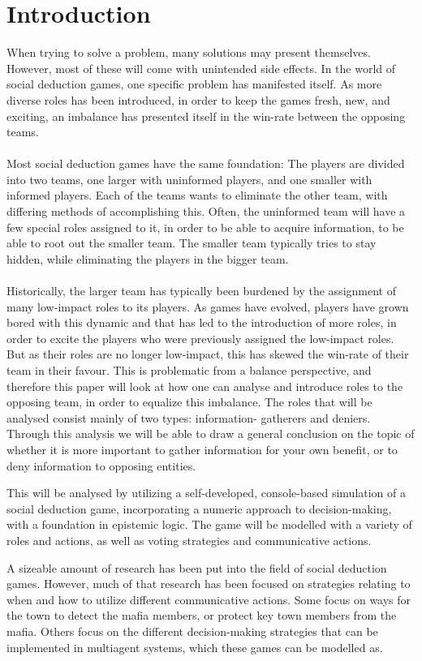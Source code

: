 \section{Introduction}
When trying to solve a problem, many solutions may present themselves. However,
most of these will come with unintended side effects. In the world of social
deduction games, one specific problem has manifested itself. As more diverse
roles has been introduced, in order to keep the games fresh, new, and exciting,
an imbalance has presented itself in the win-rate between the opposing teams.
\\ \\ Most social deduction games have the same foundation: The players are
divided into two teams, one larger with uninformed players, and one smaller
with informed players. Each of the teams wants to eliminate the other team,
with differing methods of accomplishing this. Often, the uninformed team will
have a few special roles assigned to it, in order to be able to acquire
information, to be able to root out the smaller team. The smaller team
typically tries to stay hidden, while eliminating the players in the bigger
team.\\ \\ Historically, the larger team has typically been burdened by the
assignment of many low-impact roles to its players. As games have evolved,
players have grown bored with this dynamic and that has led to the introduction
of more roles, in order to excite the players who were previously assigned the
low-impact roles. But as their roles are no longer low-impact, this has skewed
the win-rate of their team in their favour. This is problematic from a balance
perspective, and therefore this paper will look at how one can analyse and
introduce roles to the opposing team, in order to equalize this imbalance. The
roles that will be analysed consist mainly of two types: information- gatherers
and deniers. Through this analysis we will be able to draw a general conclusion
on the topic of whether it is more important to gather information for your own
benefit, or to deny information to opposing entities.

This will be analysed by utilizing a self-developed, console-based simulation
of a social deduction game, incorporating a numeric approach to
decision-making, with a foundation in epistemic logic. The game will be
modelled with a variety of roles and actions, as well as voting strategies and
communicative actions.

A sizeable amount of research has been put into the field of social deduction
games. However, much of that research has been focused on strategies relating
to when and how to utilize different communicative actions\cite{commitment}.
Some focus on ways for the town to detect the mafia
members\cite{werewolf_stealth}, or protect key town members from the
mafia\cite{werewolf_nash_equilibrium}. Others focus on the different
decision-making strategies that can be implemented in multiagent systems, which
these games can be modelled
as\cite{modelling_multi_agent_epistemic_systems}\cite{multi_agent_epistemic_planner_common_knowledge}\cite{probibalistic_multiagent_systems}.


